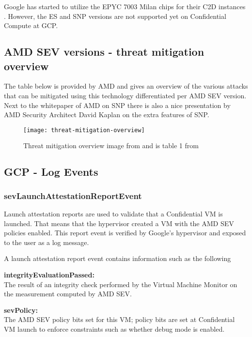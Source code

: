 Google has started to utilize the EPYC 7003 Milan chips 
for their C2D instances \citep{czop_introducing_2022}. 
However, the ES and SNP versions 
are not supported yet on Confidential Compute at GCP. 


\subsection{AMD SEV versions - threat mitigation overview}
The table below is provided by AMD 
and gives an overview of the various attacks 
that can be mitigated using this technology differentiated per AMD SEV version. 
Next to the whitepaper of AMD on SNP \citep{amd_amd_2020}
there is also a nice presentation by AMD Security Architect 
David Kaplan \citep{kaplan_upcoming_2019} on the extra features of SNP. 

\begin{figure}[!ht]
    \centering
    \texttt{[image: threat-mitigation-overview]}
    \caption{Threat mitigation overview image 
     from \cite{larabel_amd_2022} and is table 1 from \cite{amd_amd_2020}}
    \label{fig:threat-mitigation-overview}
\end{figure}

 

\subsection{GCP - Log Events}

\subsubsection{sevLaunchAttestationReportEvent}
Launch attestation reports are used to validate 
that a Confidential VM is launched. 
That means that the hypervisor created a VM 
with the AMD SEV policies enabled. 
This report event is verified by Google’s hypervisor 
and exposed to the user as a log message.

A launch attestation report event contains information such as the following

\textbf{integrityEvaluationPassed: }\\
The result of an integrity check performed by the Virtual Machine Monitor 
on the measurement computed by AMD SEV.

\textbf{sevPolicy: }\\
The AMD SEV policy bits set for this VM; 
policy bits are set at Confidential VM launch to enforce constraints such as whether debug mode is enabled.

